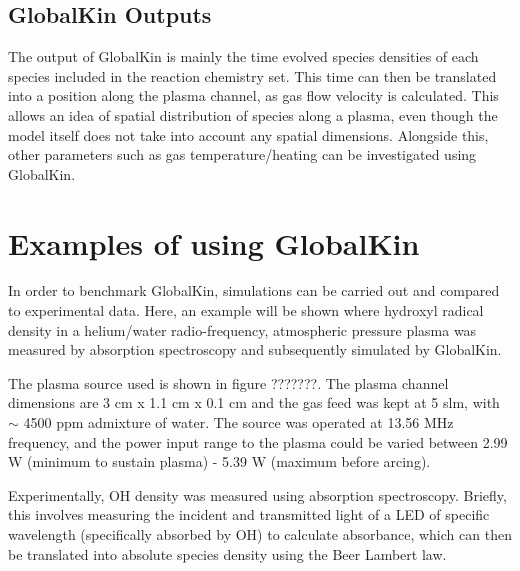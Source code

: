 \documentclass[11pt, oneside]{article}   	%
\begin{document}

\subsection{GlobalKin Outputs}
The output of GlobalKin is mainly the time evolved species densities of each species included in the reaction chemistry set.
This time can then be translated into a position along the plasma channel, as gas flow velocity is calculated.
This allows an idea of spatial distribution of species along a plasma, even though the model itself does not take into account any spatial dimensions. Alongside this, other parameters such as gas temperature/heating can be investigated using GlobalKin.

\section{Examples of using GlobalKin}
In order to benchmark GlobalKin, simulations can be carried out and compared to experimental data.
Here, an example will be shown where hydroxyl radical density in a helium/water radio-frequency, atmospheric pressure plasma was measured by absorption spectroscopy and subsequently simulated by GlobalKin.

The plasma source used is shown in figure ???????.
The plasma channel dimensions are 3 cm x 1.1 cm x 0.1 cm and the gas feed was kept at 5 slm, with $\sim$ 4500 ppm admixture of water.
The source was operated at 13.56 MHz frequency, and the power input range to the plasma could be varied between 2.99 W (minimum to sustain plasma) - 5.39 W (maximum before arcing).

Experimentally, OH density was measured using absorption spectroscopy.
Briefly, this involves measuring the incident and transmitted light of a LED of specific wavelength (specifically absorbed by OH) to calculate absorbance, which can then be translated into absolute species density using the Beer Lambert law.
\end{document}
